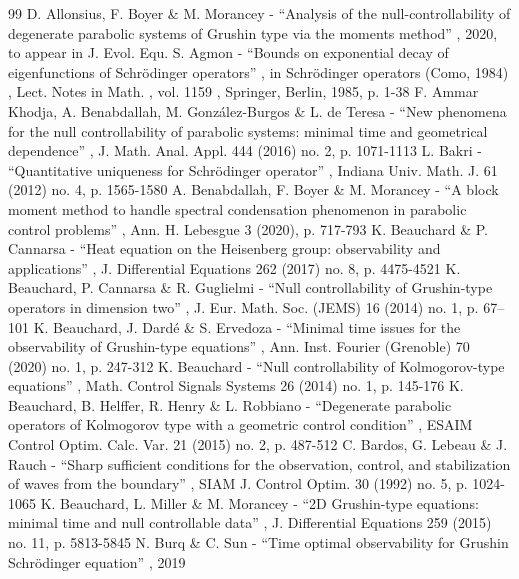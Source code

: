 \documentclass[11pt]{article}
\numberwithin{equation}{section}
\theoremstyle{plain}
\theoremstyle{definition}
\newcommand{\1}{\mathds 1}
\begin{document}
\begin{thebibliography}{99}
 D. Allonsius, F. Boyer \& M. Morancey - “Analysis of the null-controllability of degenerate parabolic systems of Grushin type via the moments method” , 2020, to appear in J. Evol. Equ.
 S. Agmon - “Bounds on exponential decay of eigenfunctions of Schrödinger operators” , in Schrödinger operators (Como, 1984) , Lect. Notes in Math. , vol. 1159 , Springer, Berlin, 1985, p. 1-38
 F. Ammar Khodja, A. Benabdallah, M. González-Burgos \& L. de Teresa - “New phenomena for the null controllability of parabolic systems: minimal time and geometrical dependence” , J. Math. Anal. Appl. 444 (2016) no. 2, p. 1071-1113
 L. Bakri - “Quantitative uniqueness for Schrödinger operator” , Indiana Univ. Math. J. 61 (2012) no. 4, p. 1565-1580
 A. Benabdallah, F. Boyer \& M. Morancey - “A block moment method to handle spectral condensation phenomenon in parabolic control problems” , Ann. H. Lebesgue 3 (2020), p. 717-793
 K. Beauchard \& P. Cannarsa - “Heat equation on the Heisenberg group: observability and applications” , J. Differential Equations 262 (2017) no. 8, p. 4475-4521
 K. Beauchard, P. Cannarsa \& R. Guglielmi - “Null controllability of Grushin-type operators in dimension two” , J. Eur. Math. Soc. (JEMS) 16 (2014) no. 1, p. 67–101
 K. Beauchard, J. Dardé \& S. Ervedoza - “Minimal time issues for the observability of Grushin-type equations” , Ann. Inst. Fourier (Grenoble) 70 (2020) no. 1, p. 247-312
 K. Beauchard - “Null controllability of Kolmogorov-type equations” , Math. Control Signals Systems 26 (2014) no. 1, p. 145-176
 K. Beauchard, B. Helffer, R. Henry \& L. Robbiano - “Degenerate parabolic operators of Kolmogorov type with a geometric control condition” , ESAIM Control Optim. Calc. Var. 21 (2015) no. 2, p. 487-512
 C. Bardos, G. Lebeau \& J. Rauch - “Sharp sufficient conditions for the observation, control, and stabilization of waves from the boundary” , SIAM J. Control Optim. 30 (1992) no. 5, p. 1024-1065
 K. Beauchard, L. Miller \& M. Morancey - “2D Grushin-type equations: minimal time and null controllable data” , J. Differential Equations 259 (2015) no. 11, p. 5813-5845
 N. Burq \& C. Sun - “Time optimal observability for Grushin Schrödinger equation” , 2019

\end{thebibliography}
\end{document}
